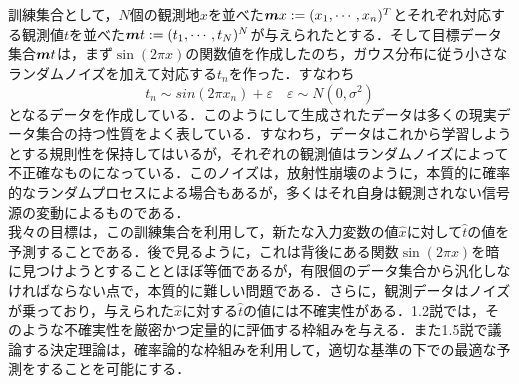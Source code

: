 \documentclass[a4j,11pt]{article}
\newcommand{\bm}{\mbox{\boldmath {$m$}}}
\begin{document}
\large

\section{}
\subsection{}訓練集合として，$N$個の観測地$x$を並べた${\bm x}:=(x_1,\cdots,x_n)^T $とそれぞれ対応する観測値$t$を並べた${\bm t}:= (t_1,\cdots,t_N)^N$が与えられたとする．そして目標データ集合${\bm t}$は，まず$\sin(2\pi x)$の関数値を作成したのち，ガウス分布に従う小さなランダムノイズを加えて対応する$t_n$を作った．すなわち
$$t_n \sim sin(2\pi x_n) + \varepsilon \quad \varepsilon \sim N(0,\sigma^2)$$
となるデータを作成している．このようにして生成されたデータは多くの現実データ集合の持つ性質をよく表している．すなわち，データはこれから学習しようとする規則性を保持してはいるが，それぞれの観測値はランダムノイズによって不正確なものになっている．このノイズは，放射性崩壊のように，本質的に確率的なランダムプロセスによる場合もあるが，多くはそれ自身は観測されない信号源の変動によるものである．\\

我々の目標は，この訓練集合を利用して，新たな入力変数の値$\hat{x}$に対して$\hat{t}$の値を予測することである．後で見るように，これは背後にある関数$\sin (2\pi x)$を暗に見つけようとすることとほぼ等価であるが，有限個のデータ集合から汎化しなければならない点で，本質的に難しい問題である．さらに，観測データはノイズが乗っており，与えられた$\hat{x}$に対する$\hat t$の値には不確実性がある．1.2説では，そのような不確実性を厳密かつ定量的に評価する枠組みを与える．また1.5説で議論する決定理論は，確率論的な枠組みを利用して，適切な基準の下での最適な予測をすることを可能にする．\\
\end{document}
